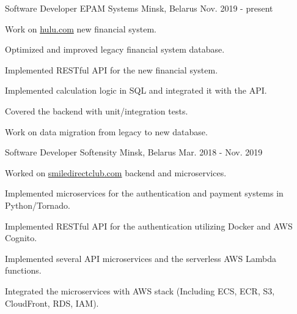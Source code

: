 

\begin{cventries}
  \cventry
    {Software Developer} %
    {EPAM Systems} %
    {Minsk, Belarus} %
    {Nov. 2019 - present} %
    {
      \begin{cvitems} %
        \item {Work on \href{www.hulu.com}{hulu.com} new financial system.}
        \item {Optimized and improved legacy financial system database.}
        \item {Implemented RESTful API for the new financial system.}
        \item {Implemented calculation logic in SQL and integrated it with the API.}
        \item {Covered the backend with unit/integration tests.}
        \item {Work on data migration from legacy to new database.}
      \end{cvitems}
    }

  \cventry
    {Software Developer} %
    {Softensity} %
    {Minsk, Belarus} %
    {Mar. 2018 - Nov. 2019} %
    {
      \begin{cvitems} %
        \item {Worked on \href{www.smiledirectclub.com}{smiledirectclub.com} backend and microservices.}
        \item {Implemented microservices for the authentication and payment systems in Python/Tornado.}
        \item {Implemented RESTful API for the authentication utilizing Docker and AWS Cognito.}
        \item {Implemented several API microservices and the serverless AWS Lambda functions.}
        \item {Integrated the microservices with AWS stack (Including ECS, ECR, S3, CloudFront, RDS, IAM).}
      \end{cvitems}
    }


\end{cventries}
